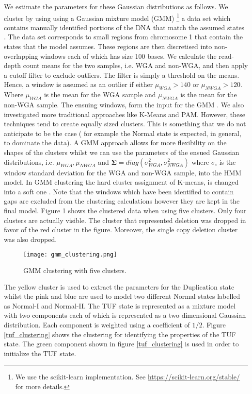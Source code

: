\documentclass[12pt]{article}
\begin{document}
We estimate the parameters for these Gaussian distributions as follows. We cluster by using using a Gaussian mixture model (GMM)   \footnote{We use the scikit-learn implementation. See \url{https://scikit-learn.org/stable/}  for more details.} \cite{flach2012}  a data set which contains manually identified portions of the DNA that match the assumed states . The data set corresponds to small regions from chromosome 1 that contain the states that the model assumes. These regions are then discretised into non-overlapping windows each of which has size 100 bases.  We calculate the read-depth count means for the two samples, i.e. WGA and non-WGA, and then apply a cutoff filter to exclude outliers. The filter is simply a threshold on the means. Hence, a window is assumed as an outlier if either $\mu_{WGA} > 140$ or $\mu_{NWGA} > 120$. Where $\mu_{WGA}$ is the mean for the WGA sample and $\mu_{NWGA}$ is the mean for the non-WGA sample. The ensuing windows, form the input for the GMM .  We also investigated more traditional approaches like K-Means and PAM. However, these techniques tend to create equally sized clusters. This is something  that we do not anticipate to be the case ( for example the Normal state is expected, in general, to dominate the data). A GMM approach allows for more flexibility on the shapes of the clusters whilst we can use the parameters of the ensued Gaussian distributions, i.e. $\mu_{WGA}, \mu_{NWGA}$ and   $\boldsymbol{\Sigma} = diag(\sigma_{WGA}^2, \sigma_{NWGA}^2)$ where $\sigma_{i}$ is the window standard  deviation for the WGA and non-WGA sample,  into the HMM model. In GMM clustering the hard cluster assignment of K-means, is changed into a soft one \cite{flach2012}. Note that the windows which have been identified to contain gaps are excluded from the clustering calculations however they are kept in the final model.
Figure \ref{gmm_clustering} shows the clustered data when using five clusters. Only four clusters are actually visible. The cluster that represented deletion was dropped in favor of the  red cluster in the figure. Moreover, the single copy deletion cluster was also dropped.  
\begin{figure}[!htb]
	\begin{center}
		\texttt{[image: gmm\_clustering.png]}
	\end{center}
	\caption{GMM clustering with five clusters.}
	\label{gmm_clustering}
\end{figure}  
The yellow cluster is used to extract the parameters for the Duplication state whilst the pink and blue are used to model two different Normal states labelled as Normal-I and Normal-II.
The TUF state is represented as a mixture model with two components each of which is represented as a two dimensional Gaussian distribution. Each component is weighted using a coefficient of $1/2$.  Figure \ref{tuf_clustering} shows the clustering for identifying the properties of the TUF state. The green component shown in figure \ref{tuf_clustering} is used in order to initialize the TUF state.
\end{document}

